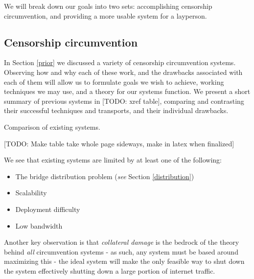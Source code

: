 \documentclass[12pt]{report}
\begin{document}
We will break down our goals into two sets: accomplishing censorship circumvention, and providing a more usable system for a layperson.

\subsection{Censorship circumvention}

In Section \ref{prior} we discussed a variety of censorship circumvention systems. Observing how and why each of these work, and the drawbacks associated with each of them will allow us to formulate goals we wish to achieve, working techniques we may use, and a theory for our systems function. We present a short summary of previous systems in [TODO: xref table], comparing and contrasting their successful techniques and transports, and their individual drawbacks.

\begin{table}
\caption{Comparison of existing systems.}
\begin{center}
[TODO: Make table take whole page sideways, make in latex when finalized]
\end{center}
\end{table}

We see that existing systems are limited by at least one of the following:
\begin{itemize}
  \item The bridge distribution problem (\emph{see} Section \ref{distribution})
  \item Scalability
  \item Deployment difficulty
  \item Low bandwidth
\end{itemize}

Another key observation is that \emph{collateral damage} is the bedrock of the theory behind \emph{all} circumvention systems - as such, any system must be based around maximizing this - the ideal system will make the only feasible way to shut down the system effectively shutting down a large portion of internet traffic. 
\end{document}
